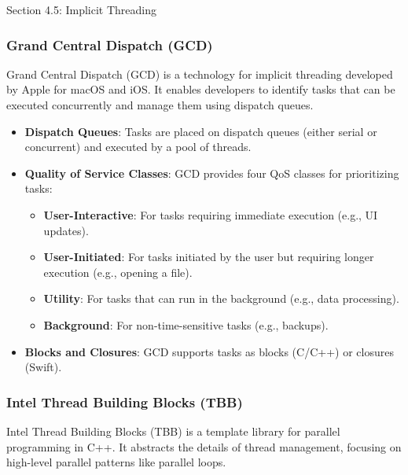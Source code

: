 \begin{notes}{Section 4.5: Implicit Threading}
\begin{highlight}[OpenMP]
    \end{highlight}
    
    \subsubsection*{Grand Central Dispatch (GCD)}
    
    Grand Central Dispatch (GCD) is a technology for implicit threading developed by Apple for macOS and iOS. It enables developers to identify tasks that can be executed concurrently and manage them 
    using dispatch queues.
    
    \begin{highlight}
    
        \begin{itemize}
            \item \textbf{Dispatch Queues}: Tasks are placed on dispatch queues (either serial or concurrent) and executed by a pool of threads.
            \item \textbf{Quality of Service Classes}: GCD provides four QoS classes for prioritizing tasks:
                \begin{itemize}
                    \item \textbf{User-Interactive}: For tasks requiring immediate execution (e.g., UI updates).
                    \item \textbf{User-Initiated}: For tasks initiated by the user but requiring longer execution (e.g., opening a file).
                    \item \textbf{Utility}: For tasks that can run in the background (e.g., data processing).
                    \item \textbf{Background}: For non-time-sensitive tasks (e.g., backups).
                \end{itemize}
            \item \textbf{Blocks and Closures}: GCD supports tasks as blocks (C/C++) or closures (Swift).
        \end{itemize}
    
    \end{highlight}
    
    \subsubsection*{Intel Thread Building Blocks (TBB)}
    
    Intel Thread Building Blocks (TBB) is a template library for parallel programming in C++. It abstracts the details of thread management, focusing on high-level parallel patterns like parallel loops.
    

\end{notes}
